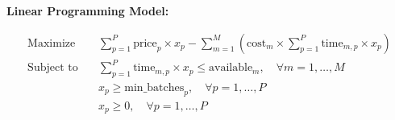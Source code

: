 \documentclass{article}
\begin{document}
\textbf{Linear Programming Model:}

\begin{align*}
    \text{Maximize} \quad & \sum_{p=1}^P \text{price}_{p} \times x_p - \sum_{m=1}^M \left( \text{cost}_{m} \times \sum_{p=1}^P \text{time}_{m,p} \times x_p \right) \\
    \text{Subject to} \quad & \sum_{p=1}^P \text{time}_{m,p} \times x_p \leq \text{available}_{m}, \quad \forall m = 1, \ldots, M \\
    & x_p \geq \text{min_batches}_{p}, \quad \forall p = 1, \ldots, P \\
    & x_p \geq 0, \quad \forall p = 1, \ldots, P \\
\end{align*}
\end{document}
